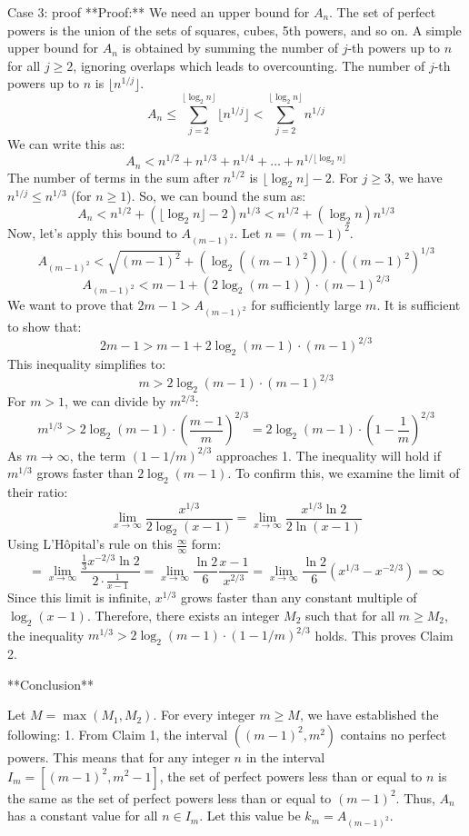 \documentclass{article} %
\begin{document}
\begin{promptbox}{Case 3: proof}
**Proof:**
We need an upper bound for $A_n$. The set of perfect powers is the union of the sets of squares, cubes, 5th powers, and so on. A simple upper bound for $A_n$ is obtained by summing the number of $j$-th powers up to $n$ for all $j \ge 2$, ignoring overlaps which leads to overcounting.
The number of $j$-th powers up to $n$ is $\lfloor n^{1/j} \rfloor$.
$$ A_n \le \sum_{j=2}^{\lfloor \log_2 n \rfloor} \lfloor n^{1/j} \rfloor < \sum_{j=2}^{\lfloor \log_2 n \rfloor} n^{1/j} $$
We can write this as:
$$ A_n < n^{1/2} + n^{1/3} + n^{1/4} + \dots + n^{1/\lfloor\log_2 n\rfloor} $$
The number of terms in the sum after $n^{1/2}$ is $\lfloor \log_2 n \rfloor - 2$. For $j \ge 3$, we have $n^{1/j} \le n^{1/3}$ (for $n \ge 1$).
So, we can bound the sum as:
$$ A_n < n^{1/2} + (\lfloor \log_2 n \rfloor - 2)n^{1/3} < n^{1/2} + (\log_2 n) n^{1/3} $$
Now, let's apply this bound to $A_{(m-1)^2}$. Let $n = (m-1)^2$.
$$ A_{(m-1)^2} < \sqrt{(m-1)^2} + (\log_2((m-1)^2)) \cdot ((m-1)^2)^{1/3} $$
$$ A_{(m-1)^2} < m-1 + (2\log_2(m-1)) \cdot (m-1)^{2/3} $$
We want to prove that $2m-1 > A_{(m-1)^2}$ for sufficiently large $m$. It is sufficient to show that:
$$ 2m-1 > m-1 + 2\log_2(m-1) \cdot (m-1)^{2/3} $$
This inequality simplifies to:
$$ m > 2\log_2(m-1) \cdot (m-1)^{2/3} $$
For $m > 1$, we can divide by $m^{2/3}$:
$$ m^{1/3} > 2\log_2(m-1) \cdot \left(\frac{m-1}{m}\right)^{2/3} = 2\log_2(m-1) \cdot \left(1 - \frac{1}{m}\right)^{2/3} $$
As $m \to \infty$, the term $(1-1/m)^{2/3}$ approaches 1. The inequality will hold if $m^{1/3}$ grows faster than $2\log_2(m-1)$. To confirm this, we examine the limit of their ratio:
$$ \lim_{x\to\infty} \frac{x^{1/3}}{2\log_2(x-1)} = \lim_{x\to\infty} \frac{x^{1/3} \ln 2}{2 \ln(x-1)} $$
Using L'Hôpital's rule on this $\frac{\infty}{\infty}$ form:
$$ = \lim_{x\to\infty} \frac{\frac{1}{3}x^{-2/3} \ln 2}{2 \cdot \frac{1}{x-1}} = \lim_{x\to\infty} \frac{\ln 2}{6} \frac{x-1}{x^{2/3}} = \lim_{x\to\infty} \frac{\ln 2}{6} (x^{1/3} - x^{-2/3}) = \infty $$
Since this limit is infinite, $x^{1/3}$ grows faster than any constant multiple of $\log_2(x-1)$.
Therefore, there exists an integer $M_2$ such that for all $m \ge M_2$, the inequality $m^{1/3} > 2\log_2(m-1) \cdot (1 - 1/m)^{2/3}$ holds. This proves Claim 2.

**Conclusion**

Let $M = \max(M_1, M_2)$. For every integer $m \ge M$, we have established the following:
1.  From Claim 1, the interval $((m-1)^2, m^2)$ contains no perfect powers. This means that for any integer $n$ in the interval $I_m = [(m-1)^2, m^2-1]$, the set of perfect powers less than or equal to $n$ is the same as the set of perfect powers less than or equal to $(m-1)^2$.
    Thus, $A_n$ has a constant value for all $n \in I_m$. Let this value be $k_m = A_{(m-1)^2}$.


\end{promptbox}
\end{document}

